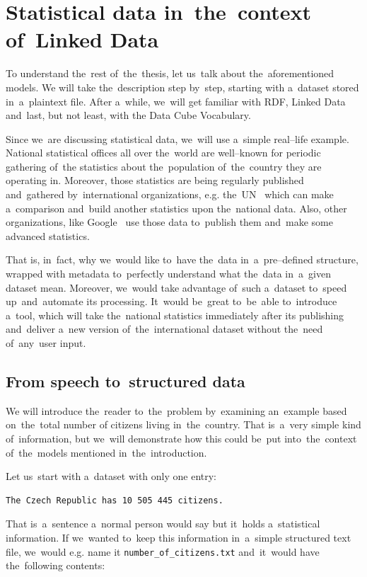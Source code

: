 \chapter{Statistical data in~the~context of~Linked Data}
\label{ch:statistical-data}
To understand the~rest of~the~thesis, let us~talk about the~aforementioned models.
We will take the~description step by~step, starting with a~dataset stored in~a~plaintext file.
After a~while, we~will get familiar with RDF, Linked Data and~last, but not least, with the
Data Cube Vocabulary.

Since we~are discussing statistical data, we~will use a~simple real--life example.
National statistical offices all over the~world are well--known for periodic gathering of~the
statistics about the~population of~the~country they are operating in. Moreover, 
those statistics are being regularly published and~gathered by~international 
organizations, e.g. the~UN~\cite{un} which can make a~comparison and~build 
another statistics upon the~national data. Also, other organizations, like 
Google~\cite{pubdata} use those data to~publish them and~make 
some advanced statistics.

That is, in~fact, why we~would like to~have the~data in~a~pre--defined structure,
wrapped with metadata to~perfectly understand what the~data in~a~given 
dataset mean. Moreover, we~would take advantage of~such a~dataset to~speed up~and~automate its processing. It~would be~great to~be~able to~introduce a~tool, 
which will take the~national statistics immediately after its publishing and~deliver a~new version of~the~international dataset without the~need of~any~user 
input.

\section{From speech to~structured data}

We will introduce the~reader to~the~problem by~examining an~example based on~the~total number of
citizens living in~the~country. That is~a~very simple kind of~information, but we~will demonstrate
how this could be~put into~the~context of~the~models mentioned in~the~introduction.

Let us~start with a~dataset with only one entry:

\begin{verbatim}
The Czech Republic has 10 505 445 citizens.
\end{verbatim}

That is~a~sentence a~normal person would say but it~holds a~statistical information.
If we~wanted to~keep this information in~a~simple structured text file, we~would e.g. name it
\texttt{number\_of\_citizens.txt} and~it~would have the~following contents:

